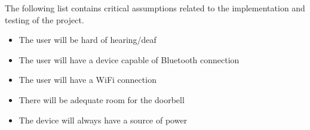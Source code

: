 


The following list contains critical assumptions related to the implementation and testing of the project.

\begin{itemize}
  \item The user will be hard of hearing/deaf
  \item The user will have a device capable of Bluetooth connection
  \item The user will have a WiFi connection
  \item There will be adequate room for the doorbell
  \item The device will always have a source of power
\end{itemize}